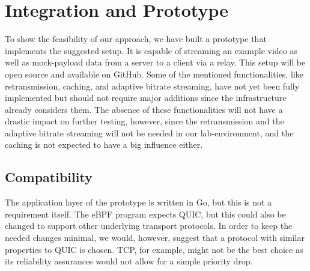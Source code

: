 \section{Integration and Prototype}\label{sec:integration_and_prototype}

To show the feasibility of our approach, we have built a prototype 
that implements the suggested setup.
It is capable of streaming an example video as well as mock-payload data from 
a server to a client via a relay.
This setup will be open source and available on GitHub.
Some of the mentioned functionalities, like retransmission, caching, and adaptive
bitrate streaming, have not yet been fully implemented but should not require major
additions since the infrastructure already considers them.
The absence of these functionalities will not have a drastic impact on further 
testing, however, since the retransmission and the adaptive bitrate streaming will not
be needed in our lab-environment, and the caching is not expected to have a big influence
either.

\subsection{Compatibility}
The application layer of the prototype is written in Go, but this is not a requirement
itself.
The eBPF program expects QUIC, but this could also be changed to support other underlying 
transport protocols.
In order to keep the needed changes minimal, we would, however, suggest that a protocol
with similar properties to QUIC is chosen.
TCP, for example, might not be the best choice as its reliability assurances would not 
allow for a simple priority drop.

